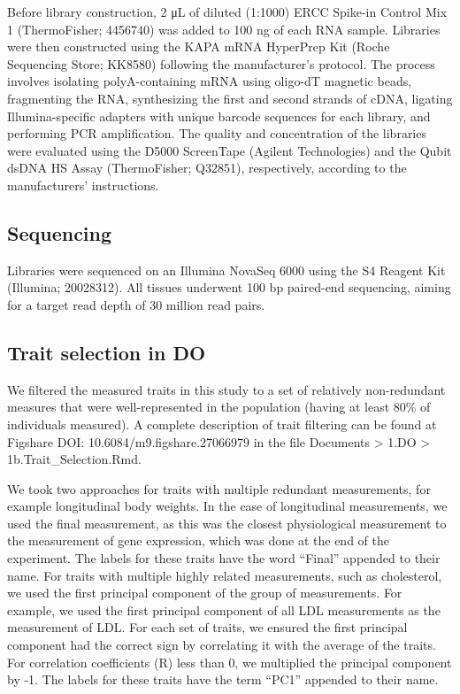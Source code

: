 \documentclass[
]{article}
\begin{document}
Before library construction, 2 \si{\micro\liter} of diluted (1:1000)
ERCC Spike-in Control Mix 1 (ThermoFisher; 4456740) was added to 100 ng
of each RNA sample. Libraries were then constructed using the KAPA mRNA
HyperPrep Kit (Roche Sequencing Store; KK8580) following the
manufacturer's protocol. The process involves isolating polyA-containing
mRNA using oligo-dT magnetic beads, fragmenting the RNA, synthesizing
the first and second strands of cDNA, ligating Illumina-specific
adapters with unique barcode sequences for each library, and performing
PCR amplification. The quality and concentration of the libraries were
evaluated using the D5000 ScreenTape (Agilent Technologies) and the
Qubit dsDNA HS Assay (ThermoFisher; Q32851), respectively, according to
the manufacturers' instructions.

\subsection{Sequencing}\label{sequencing}

Libraries were sequenced on an Illumina NovaSeq 6000 using the S4
Reagent Kit (Illumina; 20028312). All tissues underwent 100 bp
paired-end sequencing, aiming for a target read depth of 30 million read
pairs.

\subsection{Trait selection in DO}\label{trait-selection-in-do}

We filtered the measured traits in this study to a set of relatively
non-redundant measures that were well-represented in the population
(having at least 80\% of individuals measured). A complete description
of trait filtering can be found at Figshare DOI:
10.6084/m9.figshare.27066979 in the file Documents \textgreater{} 1.DO
\textgreater{} 1b.Trait\_Selection.Rmd.

We took two approaches for traits with multiple redundant measurements,
for example longitudinal body weights. In the case of longitudinal
measurements, we used the final measurement, as this was the closest
physiological measurement to the measurement of gene expression, which
was done at the end of the experiment. The labels for these traits have
the word ``Final'' appended to their name. For traits with multiple
highly related measurements, such as cholesterol, we used the first
principal component of the group of measurements. For example, we used
the first principal component of all LDL measurements as the measurement
of LDL. For each set of traits, we ensured the first principal component
had the correct sign by correlating it with the average of the traits.
For correlation coefficients (R) less than 0, we multiplied the
principal component by -1. The labels for these traits have the term
``PC1'' appended to their name.
\end{document}
